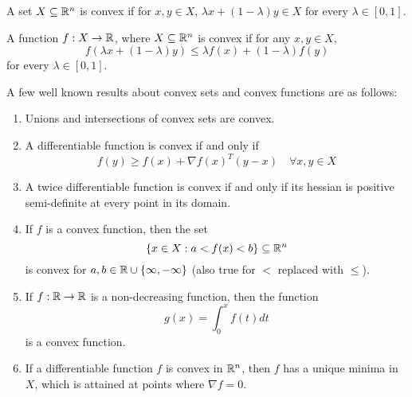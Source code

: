 \begin{definition}
	A set $X\subseteq \mathbb{R}^n$ is convex if for $x,y\in X$,
	$\lambda x + (1-\lambda)y \in X$ for every $\lambda \in [0,1]$.
\end{definition}


\begin{definition}
	A function $f:X\rightarrow \mathbb{R}$, where $X\subseteq \mathbb{R}^n$ is
	convex if for any $x,y\in X$,
	\[
		f(\lambda x + (1-\lambda)y) \leq \lambda f(x) + (1-\lambda)f(y)
	\]
	for every $\lambda \in [0,1]$.
\end{definition}


A few well known results about convex sets and
convex functions are as follows:
\begin{enumerate}
	\item Unions and intersections of convex sets are convex.

	\item A differentiable function is convex if and only if
	\[
		f(y)\geq f(x) + \nabla f(x)^T (y-x)\quad \forall x,y\in X
	\]

	\item A twice differentiable function is convex if and only if
	its hessian is positive semi-definite at every point in its
	domain.

	\item If $f$ is a convex function, then the set
	\[
		\{x\in X: a< f(x) < b\}\subseteq \mathbb{R}^n
	\]
	is convex for $a,b\in \mathbb{R}\cup\{\infty,-\infty\}$ (also true
	for $<$ replaced with $\leq$).

	\item If $f:\mathbb{R}\rightarrow \mathbb{R}$ is a non-decreasing function,
	then the function
	\[
		g(x) = \int_{0}^x f(t)dt
	\]
	is a convex function.

	\item If a differentiable function $f$ is convex in $\mathbb{R}^n$,
	then $f$ has a unique minima in $X$, which is attained at points
	where $\nabla f = 0$.
\end{enumerate}
